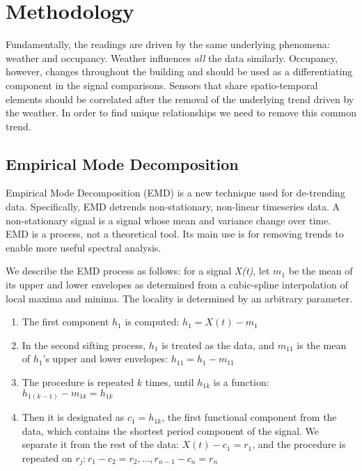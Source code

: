 


\section{Methodology}\label{method}

Fundamentally, the readings are driven by the same underlying phenomena: 
weather and occupancy.  Weather influences \emph{all} the data similarly.  Occupancy, however, changes
throughout the building and should be used as a differentiating component in the signal
comparisons.  Sensors that share spatio-temporal elements should be correlated after the removal
of the underlying trend driven by the weather.  In order to find unique relationships we need to remove 
this common trend.

\subsection{Empirical Mode Decomposition}
Empirical Mode Decomposition (EMD) \cite{huang:emd1998} is a new technique used for de-trending data.
Specifically, EMD detrends non-stationary, non-linear timeseries data.  
A non-stationary signal is a signal whose mean and
variance change over time.  EMD is a process, not a theoretical tool.  Its main use is for removing trends 
to enable more useful spectral analysis.

We describe the EMD process as follows:  for a signal \emph{X(t)}, let $m_1$ be the mean of its upper and
lower envelopes as determined from a cubic-spline interpolation of local maxima and minima. The locality 
is determined by an arbitrary parameter.

\begin{enumerate}
\item The first component $h_1$ is computed: $h_1=X(t)-m_1$
\item In the second sifting process, $h_1$ is treated as the data, and $m_{11}$ is the mean of $h_1$'s upper and lower envelopes: $h_{11}=h_1-m_{11}$
\item The procedure is repeated $k$ times, until $h_{1k}$ is a function: $h_{1(k-1)}-m_{1k}=h_{1k}$
\item Then it is designated as $c_1=h_{1k}$, the first functional component from the data, which contains the shortest period component of the signal. We separate it from the rest of the data: $X(t)-c_1 = r_1$, and the procedure is
repeated on $r_j: r_1-c_2 = r_2,\dots,r_{n-1} - c_n = r_n$
\end{enumerate}

